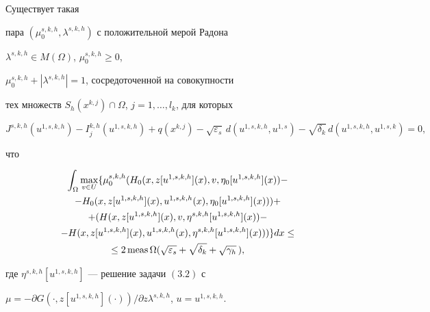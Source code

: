 \begin{lems} 


Существует такая


пара $(\mu^{s,k,h}_0,\lambda^{s,k,h})$ с положительной мерой Радона 


$\lambda^{s,k,h}\in M(\Omega)$, $\mu^{s,k,h}_0\ge0$, 


$\mu^{s,k,h}_0+|\lambda^{s,k,h}|=1$, сосредоточенной на совокупности 


тех множеств $S_h(x^{k,j})\cap\Omega$, $j=1,\dotsc,l_k$, для которых 


$$ 


J^{s,k,h}(u^{1,s,k,h})-I^{k,h}_j(u^{1,s,k,h})+ 


q(x^{k,j})-\sqrt{\varepsilon_s}\,d(u^{1,s,k,h},u^{1,s})- 


\sqrt{\delta_k}\,d(u^{1,s,k,h},u^{1,s,k})=0,


$$ 


что 


\begin{multline*} 


\int_\Omega\max_{v\in U}\{\mu^{s,k,h}_0(H_0 


(x,z[u^{1,s,k,h}](x),v,\eta_0[u^{1,s,k,h}](x))- \\


%


-H_0(x,z[u^{1,s,k,h}](x),u^{1,s,k,h}(x),\eta_0 


[u^{1,s,k,h}](x)))+ \\ 


% 


+(H(x,z[u^{1,s,k,h}](x),v, 


\eta^{s,k,h}[u^{1,s,k,h}](x))- \\


%


-H(x,z[u^{1,s,k,h}](x),u^{1,s,k,h}(x),\eta^{s,k,h} 


[u^{1,s,k,h}](x)))\}dx\le \\


\le 2\meas\Omega 


(\sqrt{\varepsilon_s}+\sqrt{\delta_k}+\sqrt{\gamma_h}\,), 


\end{multline*} 


где $\eta^{s,k,h}[u^{1,s,k,h}]$ --- решение задачи $(3.2)$ с 


$\mu=-\partial G(\cdot,z[u^{1,s,k,h}](\cdot))/\partial 


z\lambda^{s,k,h}$, $u=u^{1,s,k,h}$. 


\end{lems} 


